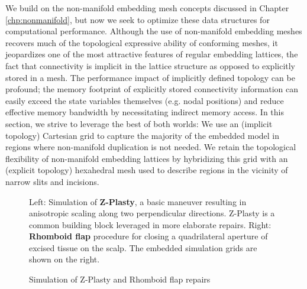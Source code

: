 We build on the non-manifold embedding mesh concepts discussed in
Chapter \ref{chp:nonmanifold}, but now we seek to optimize these
data structures for computational performance. Although the use of
non-manifold embedding meshes recovers much of the topological
expressive ability of conforming meshes, it jeopardizes one of the
most attractive features of regular embedding lattices, the fact that
connectivity is implicit in the lattice structure as opposed to
explicitly stored in a mesh. The performance impact of implicitly
defined topology can be profound; the memory footprint of explicitly
stored connectivity information can easily exceed the state variables
themselves (e.g. nodal positions) and reduce effective memory
bandwidth by necessitating indirect memory access. In this section, we
strive to leverage the best of both worlds: We use an (implicit
topology) Cartesian grid to capture the majority of the embedded model
in regions where non-manifold duplication is not needed. We retain the
topological flexibility of non-manifold embedding lattices by
hybridizing this grid with an (explicit topology) hexahedral mesh used
to describe regions in the vicinity of narrow slits and incisions.


\begin{figure}
\centering
{}




\vspace*{-.08in}
\caption{Simulation of Z-Plasty and Rhomboid flap repairs}{Left:
  Simulation of \textbf{Z-Plasty}, a basic maneuver resulting in
  anisotropic scaling along two perpendicular directions. Z-Plasty is
  a common building block leveraged in more elaborate repairs. Right:
  \textbf{Rhomboid flap} procedure for closing a quadrilateral
  aperture of excised tissue on the scalp. The embedded simulation
  grids are shown on the right.}
\label{fig:Zplasty-RhomboidScalp}
\vspace*{-.16in}
\end{figure}


